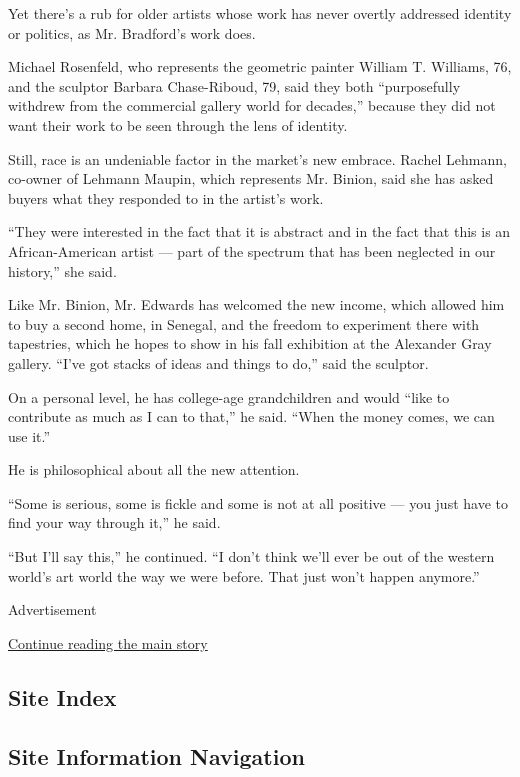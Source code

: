 Yet there's a rub for older artists whose work has never overtly
addressed identity or politics, as Mr. Bradford's work does.

Michael Rosenfeld, who represents the geometric painter William T.
Williams, 76, and the sculptor Barbara Chase-Riboud, 79, said they both
``purposefully withdrew from the commercial gallery world for decades,''
because they did not want their work to be seen through the lens of
identity.

Still, race is an undeniable factor in the market's new embrace. Rachel
Lehmann, co-owner of Lehmann Maupin, which represents Mr. Binion, said
she has asked buyers what they responded to in the artist's work.

``They were interested in the fact that it is abstract and in the fact
that this is an African-American artist --- part of the spectrum that
has been neglected in our history,'' she said.

Like Mr. Binion, Mr. Edwards has welcomed the new income, which allowed
him to buy a second home, in Senegal, and the freedom to experiment
there with tapestries, which he hopes to show in his fall exhibition at
the Alexander Gray gallery. ``I've got stacks of ideas and things to
do,'' said the sculptor.

On a personal level, he has college-age grandchildren and would ``like
to contribute as much as I can to that,'' he said. ``When the money
comes, we can use it.''

He is philosophical about all the new attention.

``Some is serious, some is fickle and some is not at all positive ---
you just have to find your way through it,'' he said.

``But I'll say this,'' he continued. ``I don't think we'll ever be out
of the western world's art world the way we were before. That just won't
happen anymore.''

Advertisement

\protect\hyperlink{after-bottom}{Continue reading the main story}

\hypertarget{site-index}{%
\subsection{Site Index}\label{site-index}}

\hypertarget{site-information-navigation}{%
\subsection{Site Information
Navigation}\label{site-information-navigation}}

